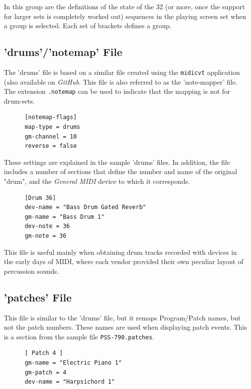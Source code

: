    In this group are the definitions of the state of the 32 (or more, once the
   support for larger sets is completely worked out) sequences
   in the playing screen set when a group is selected.
   Each set of brackets defines a group.

\subsection{'drums'/'notemap' File}
\label{subsec:configuration_drums}

   The 'drums' file is based on a similar file created using the
   \texttt{midicvt} application (also available on \textsl{GitHub}.  This file
   is also referred to as the 'note-mapper' file.
   The extension \texttt{.notemap} can be used to indicate that the mapping is
   not for drum-sets.

   \begin{verbatim}
      [notemap-flags]
      map-type = drums
      gm-channel = 10
      reverse = false
   \end{verbatim}

   These settings are explained in the sample 'drums' files.  In addition, the
   file includes a number of sections that define the number and name of the
   original "drum", and the \textsl{General MIDI} device to which it
   corresponds.

   \begin{verbatim}
      [Drum 36]
      dev-name = "Bass Drum Gated Reverb"
      gm-name = "Bass Drum 1"
      dev-note = 36
      gm-note = 36
   \end{verbatim}

   This file is useful mainly when obtaining drum tracks recorded with devices in
   the early days of MIDI, where each vendor provided their own peculiar layout of
   percussion sounds.

\subsection{'patches' File}
\label{subsec:configuration_patches}

   This file is similar to the 'drums' file, but it remaps Program/Patch
   names, but not the patch numbers.
   These names are used when displaying patch events.
   This is a section from the sample file
   \texttt{PSS-790.patches}.

   \begin{verbatim}
      [ Patch 4 ]
      gm-name = "Electric Piano 1"
      gm-patch = 4
      dev-name = "Harpsichord 1"
   \end{verbatim}

